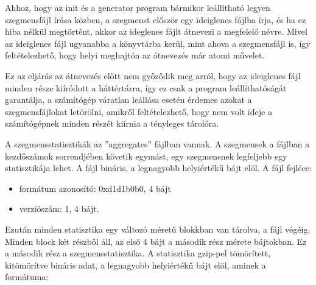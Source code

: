Ahhoz, hogy az init és a generator program bármikor leállítható legyen szegmensfájl írása közben, a szegmenst először egy ideiglenes fájlba írja, és ha ez hiba nélkül megtörtént, akkor az ideglenes fájlt átnevezi a megfelelő névre.
Mivel az ideiglenes fájl ugyanabba a könyvtárba kerül, mint ahova a szegmensfájl is, így feltételezhető, hogy helyi meghajtón az átnevezés már atomi művelet.

Ez az eljárás az átnevezés előtt nem győződik meg arról, hogy az ideiglenes fájl minden része
kiíródott a háttértárra, így ez csak a program leállíthatóságát garantálja, a számítógép váratlan leállása esetén érdemes azokat a szegmensfájlokat letörölni, amikről feltételezhető, hogy nem volt ideje a számítógépnek minden részét kiírnia a tényleges tárolóra.

A szegmensstatisztikák az ''aggregates'' fájlban vannak. A szegmensek a fájlban a kezdőszámok sorrendjében követik egymást, egy szegmensnek legfeljebb egy statisztikája lehet.
A fájl bináris, a legnagyobb helyiértékű bájt elöl. A fájl fejléce:
\begin{itemize}
\item formátum azonosító: 0xd1d1b0b0, 4 bájt  %
\item verziószám: 1, 4 bájt.
\end{itemize}
Ezután minden statisztika egy változó méretű blokkban van tárolva, a fájl végéig. Minden block két részből áll, az első 4 bájt a második rész mérete bájtokban. Ez a második rész a szegmensstatisztika. A statisztika gzip-pel tömörített, kitömörítve bináris adat, a legnagyobb helyiértékű bájt elöl, aminek a formátuma:
